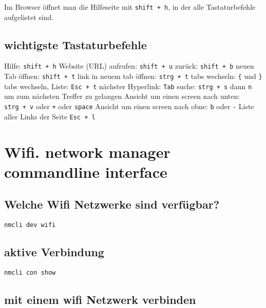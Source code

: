 \documentclass[]{book}
\begin{document}
Im Browser öffnet man die Hilfeseite mit \texttt{shift\ +\ h}, in der alle Tastaturbefehle aufgelistet sind.

\hypertarget{wichtigste-tastaturbefehle}{%
\section{wichtigste Tastaturbefehle}\label{wichtigste-tastaturbefehle}}

Hilfe: \texttt{shift\ +\ h}
Website (URL) aufrufen: \texttt{shift\ +\ u}
zurück: \texttt{shift\ +\ b}
neuen Tab öffnen: \texttt{shift\ +\ t}
link in neuem tab öffnen: \texttt{strg\ +\ t}
tabs wechseln: \texttt{\{} und \texttt{\}}
tabs wechseln, Liste: \texttt{Esc\ +\ t}
nächster Hyperlink: \texttt{Tab}
suche: \texttt{strg\ +\ s} dann \texttt{n} um zum nächsten Treffer zu gelangen
Ansicht um einen screen nach unten: \texttt{strg\ +\ v} oder \texttt{+} oder \texttt{space}
Ansicht um einen screen nach obne: \texttt{b} oder \texttt{-}
Liste aller Links der Seite \texttt{Esc\ +\ l}

\hypertarget{wifi.-network-manager-commandline-interface}{%
\chapter{Wifi. network manager commandline interface}\label{wifi.-network-manager-commandline-interface}}

\hypertarget{welche-wifi-netzwerke-sind-verfugbar}{%
\section{Welche Wifi Netzwerke sind verfügbar?}\label{welche-wifi-netzwerke-sind-verfugbar}}

\begin{verbatim}
nmcli dev wifi
\end{verbatim}

\hypertarget{aktive-verbindung}{%
\section{aktive Verbindung}\label{aktive-verbindung}}

\begin{verbatim}
nmcli con show
\end{verbatim}

\hypertarget{mit-einem-wifi-netzwerk-verbinden}{%
\section{mit einem wifi Netzwerk verbinden}\label{mit-einem-wifi-netzwerk-verbinden}}
\end{document}
